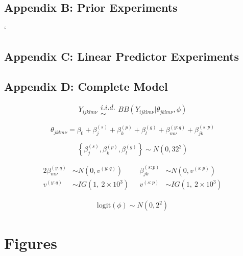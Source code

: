 \documentclass[12pt]{article}
\begin{document}
%
\subsection{Appendix B: Prior Experiments}\label{priorAppendix}

`%
\subsection{Appendix C: Linear Predictor Experiments}\label{lpAppendix}

%
\subsection{Appendix D: Complete Model}\label{modelAppendix}

%
\begin{equation}
Y_{ijklm\nu} \substack{i.i.d.\\\sim} BB(Y_{ijklm\nu}|\theta_{jklm\nu}, \phi)
\end{equation}

%
\begin{equation}
\theta_{jklm\nu} = \beta_0 + \beta^{(s)}_j + \beta^{(p)}_k + \beta^{(g)}_l + \beta^{(y:q)}_{m\nu} + \beta^{(s:p)}_{jk}
\end{equation}

\begin{equation}
\left\{\beta^{(s)}_j, \beta^{(p)}_k, \beta^{(g)}_l\right\} \sim N(0, 32^2)
\end{equation}

%
\begin{alignat}{2}
\beta^{(y:q)}_{m\nu} &\sim N(0, v^{(y:q)}) 	&~~~ \beta^{(s:p)}_{jk} &\sim N(0, v^{(s:p)}) \\
v^{(y:q)} &\sim IG(1,~2\times10^{3}) 		&~~~ v^{(s:p)} &\sim IG(1,~2\times10^{3})
\end{alignat}


%
\begin{align}
\text{logit}(\phi) \sim N(0, 2^2) 
\end{align}



%
\section{Figures}
\end{document}
